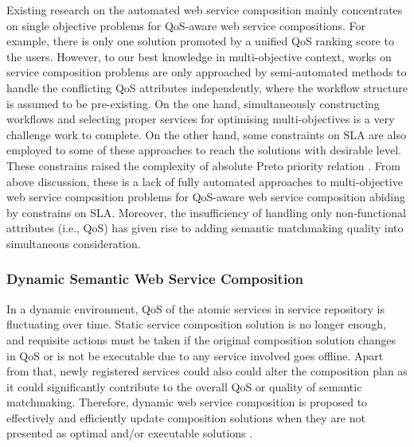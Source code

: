 Existing research on the automated web service composition mainly concentrates on single objective problems for QoS-aware web service compositions. For example, there is only one solution promoted by a unified QoS ranking score to the users. However, to our best knowledge in multi-objective context, works  \cite{liu2005dynamic,wada2012e3,yao2009qos,yin2014hybrid} on service composition problems are only approached by semi-automated methods to handle the conflicting QoS attributes independently, where the workflow structure is assumed to be pre-existing. On the one hand, simultaneously constructing workflows and selecting proper services for optimising multi-objectives is a very challenge work to complete. On the other hand, some constraints on SLA are also employed to some of these approaches to reach the solutions with desirable level. These constrains raised the complexity of absolute Preto priority relation \cite{garey1979guide}. From above discussion, these is a lack of fully automated approaches to multi-objective web service composition problems for QoS-aware web service composition abiding by constrains on SLA. Moreover, the insufficiency of handling only non-functional attributes (i.e., QoS) has given rise to adding semantic matchmaking quality into simultaneous consideration.

\subsubsection{Dynamic Semantic Web Service Composition}
In a dynamic environment, QoS of the atomic services in service repository is fluctuating over time. Static service composition solution is no longer enough, and requisite actions must be taken if the original composition solution changes in QoS or is not be executable due to any service involved goes offline. Apart from that, newly registered services could also could alter the composition plan as it could significantly contribute to the overall QoS or quality of semantic matchmaking. Therefore, dynamic web service composition is proposed to effectively and efficiently update composition solutions when they are not presented as optimal and/or executable solutions \cite{li2014fault}. 


